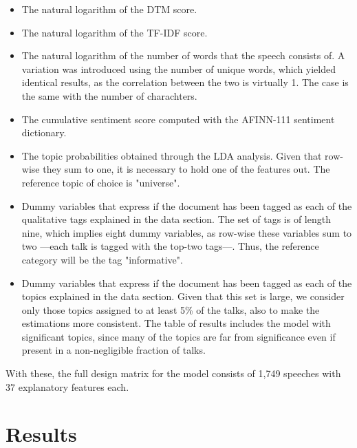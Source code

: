 \documentclass[a4paper, 11pt]{article} %
\begin{document}
\begin{itemize}
\item The natural logarithm of the DTM score.
\item The natural logarithm of the TF-IDF score.
\item The natural logarithm of the number of words that the speech consists of. A variation was introduced using the number of unique words, which yielded identical results, as the correlation between the two is virtually 1. The case is the same with the number of charachters.
\item The cumulative sentiment score computed with the AFINN-111 sentiment dictionary.
\item The topic probabilities obtained through the LDA analysis. Given that row-wise they sum to one, it is necessary to hold one of the features out. The reference topic of choice is "universe".
\item Dummy variables that express if the document has been tagged as each of  the qualitative tags explained in the data section. The set of tags is of length nine, which implies eight dummy variables, as row-wise these variables sum to two ---each talk is tagged with the top-two tags---. Thus, the reference category will be the tag "informative".
\item Dummy variables that express if the document has been tagged as each of  the topics explained in the data section. Given that this set is large, we consider only those topics assigned to at least 5\% of the talks, also to make the estimations more consistent. The table of results includes the model with significant topics, since many of the topics are far from significance even if present in a non-negligible fraction of talks.
\end{itemize}

With these, the full design matrix for the model consists of 1,749 speeches with 37 explanatory features each.

\section*{Results}
\end{document}
